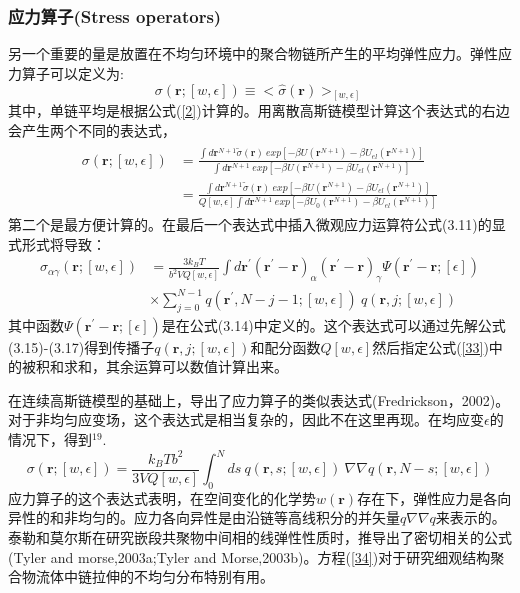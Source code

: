 \subsubsection{应力算子(Stress operators)}
另一个重要的量是放置在不均匀环境中的聚合物链所产生的平均弹性应力。弹性应力算子可以定义为:
\begin{equation}\label{31}
\sigma(\mathbf{\mathbf{r}};[w,\epsilon])\equiv<\hat{\sigma}(\mathbf{r})>_{[w,\epsilon]}
\end{equation}
其中，单链平均是根据公式(\ref{2})计算的。用离散高斯链模型计算这个表达式的右边会产生两个不同的表达式，
\begin{align}\label{32}
\begin{split}
\sigma(\mathbf{r};[w,\epsilon])&=\frac{\int d\mathbf{r}^{N+1}{\tilde{\sigma}}(\mathbf{r})~exp[-\beta U(\mathbf{r}^{N+1})-\beta U_{el}(\mathbf{r}^{N+1})]}{\int d\mathbf{r}^{N+1}~exp[-\beta U(\mathbf{r}^{N+1})-\beta U_{el}(\mathbf{r}^{N+1})]}\\&=\frac{\int d\mathbf{r}^{N+1}\tilde{\sigma}(\mathbf{r})~exp[-\beta U(\mathbf{r}^{N+1})-\beta U_{el}(\mathbf{r}^{N+1})]}{Q[w,\epsilon]\int d\mathbf{r}^{N+1}~exp[-\beta U_0(\mathbf{r}^{N+1})-\beta U_{el}(\mathbf{r}^{N+1})]}
\end{split}
\end{align}
第二个是最方便计算的。在最后一个表达式中插入微观应力运算符公式(3.11)的显式形式将导致：
\begin{equation}
\begin{aligned}\label{33}
\sigma_{\alpha \gamma}(\mathbf{r};[w,\epsilon])&=\frac{3k_BT}{b^2VQ[w,\epsilon]} \int d\mathbf{r}^{'}(\mathbf{r}^{'}-\mathbf{r})_{\alpha} (\mathbf{r}^{'}-\mathbf{r})_{\gamma} \varPsi (\mathbf{r}^{'}-\mathbf{r};[\epsilon])\\&\times \sum_{j=0}^{N-1}q(\mathbf{r}^{'},N-j-1;[w,\epsilon])~q(\mathbf{r},j;[w,\epsilon])
\end{aligned}
\end{equation}
其中函数$\varPsi (\mathbf{r}^{'}-\mathbf{r};[\epsilon])$是在公式(3.14)中定义的。这个表达式可以通过先解公式(3.15)-(3.17)得到传播子$q(\mathbf{r},j;[w,\epsilon])$和配分函数$Q[w,\epsilon]$然后指定公式(\ref{33})中的被积和求和，其余运算可以数值计算出来。

在连续高斯链模型的基础上，导出了应力算子的类似表达式(Fredrickson，2002)。对于非均匀应变场，这个表达式是相当复杂的，因此不在这里再现。在均应变$\epsilon$的情况下，得到$^{19}$.
\begin{equation}\label{34}
\sigma(\mathbf{r};[w,\epsilon])=\frac{k_BTb^2}{3VQ[w,\epsilon]}\int_{0}^{N} ds~q(\mathbf{r},s;[w,\epsilon])~\nabla \nabla q(\mathbf{r},N-s;[w,\epsilon])
\end{equation}
应力算子的这个表达式表明，在空间变化的化学势$w(\mathbf{r})$存在下，弹性应力是各向异性的和非均匀的。应力各向异性是由沿链等高线积分的并矢量$q\nabla \nabla q$来表示的。泰勒和莫尔斯在研究嵌段共聚物中间相的线弹性性质时，推导出了密切相关的公式(Tyler and morse,2003a;Tyler and Morse,2003b)。方程(\ref{34})对于研究细观结构聚合物流体中链拉伸的不均匀分布特别有用。
